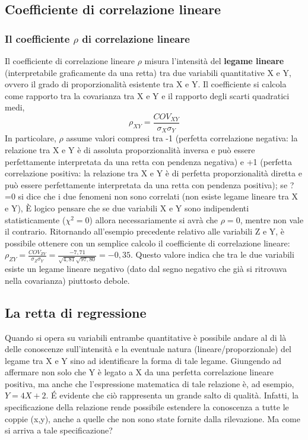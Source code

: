 \subsection{Coefficiente di correlazione lineare}

\subsubsection{Il coefficiente $\rho$ di correlazione lineare}

Il coefficiente di correlazione lineare $\rho$ misura l'intensità del 
\textbf{legame lineare} (interpretabile graficamente da una retta) tra due 
variabili quantitative X e Y, ovvero il grado di proporzionalità esistente 
tra X e Y.
Il coefficiente si calcola come rapporto tra la covarianza tra X e Y e il 
rapporto degli scarti quadratici medi, 
$$\rho_{XY}=\frac{COV_{XY}}{\sigma_X\sigma_Y}$$
 In particolare, $\rho$ assume valori compresi tra -1 (perfetta 
correlazione negativa: la relazione tra X e Y è di assoluta proporzionalità 
inversa e può essere perfettamente interpretata da una retta con pendenza 
negativa) e +1 (perfetta correlazione positiva: la relazione tra X e Y è di 
perfetta proporzionalità diretta e può essere perfettamente interpretata da 
una retta con pendenza positiva); se ?=0 si dice che i due fenomeni non sono 
correlati (non esiste legame lineare tra X e Y),  È logico pensare che se 
due variabili X e Y sono indipendenti statisticamente ($\chi^2=0$) allora 
necessariamente si avrà che $\rho=0$, mentre non vale il contrario.
 Ritornando all'esempio precedente relativo alle variabili Z e Y, è 
possibile ottenere con un semplice calcolo il coefficiente di correlazione 
lineare: 
$\rho_{ZY}=\frac{COV_{ZY}}{\sigma_Z\sigma_Y}=\frac{-7,71}{\sqrt{4,81}\sqrt{
97,80}}=-0,35$.
 Questo valore indica che tra le due variabili esiste un legame lineare 
negativo (dato dal segno negativo che già si ritrovava nella covarianza) 
piuttosto debole.
 
\subsection{La retta di regressione}
 Quando si opera su variabili entrambe quantitative è possibile andare al 
di là delle conoscenze sull'intensità e la eventuale natura 
(lineare/proporzionale) del legame tra X e Y sino ad identificare la forma 
di tale legame. Giungendo ad affermare non solo che Y è legato a X da una 
perfetta correlazione lineare positiva, ma anche che l'espressione 
matematica di tale relazione è, ad esempio, $Y=4 X +2$.
 \'E evidente che ciò rappresenta un grande salto di qualità. Infatti, la 
specificazione della relazione rende possibile estendere la conoscenza a 
tutte le coppie (x,y), anche a quelle che non sono state fornite dalla 
rilevazione.
 Ma come si arriva a tale specificazione?
 
